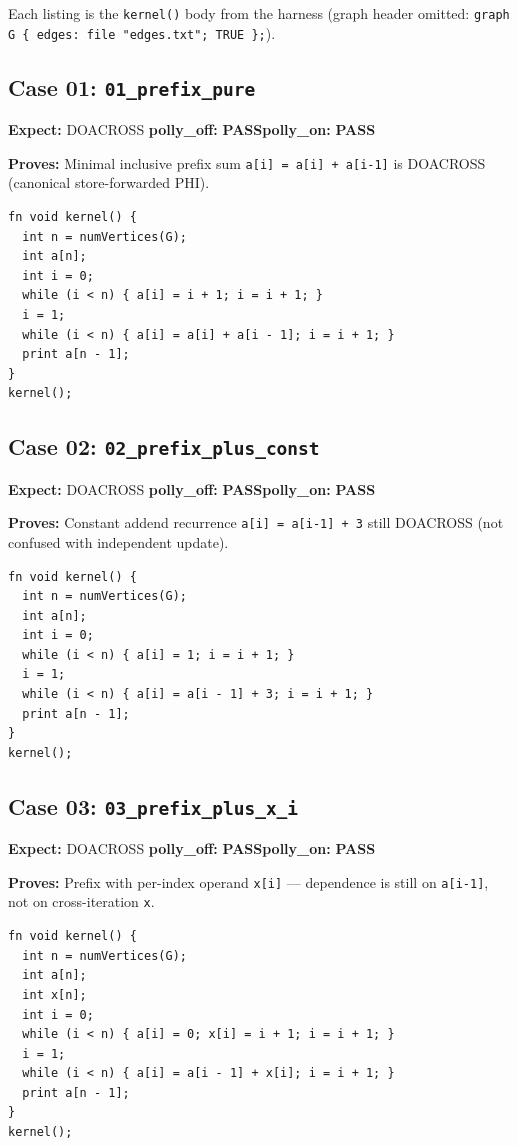 \documentclass[11pt,a4paper]{article}
\newcommand{\passmark}{\textcolor{pass}{\textbf{PASS}}}
\begin{document}
Each listing is the \texttt{kernel()} body from the harness (graph header omitted:
\texttt{graph G \{ edges: file "edges.txt"; TRUE \};}).

\subsection{Case 01: \texttt{01\_prefix\_pure}}
\textbf{Expect:} DOACROSS \quad \textbf{polly\_off:} \passmark \quad \textbf{polly\_on:} \passmark

\textbf{Proves:} Minimal inclusive prefix sum
\texttt{a[i] = a[i] + a[i-1]} is DOACROSS (canonical store-forwarded PHI).

\begin{lstlisting}
fn void kernel() {
  int n = numVertices(G);
  int a[n];
  int i = 0;
  while (i < n) { a[i] = i + 1; i = i + 1; }
  i = 1;
  while (i < n) { a[i] = a[i] + a[i - 1]; i = i + 1; }
  print a[n - 1];
}
kernel();
\end{lstlisting}

\subsection{Case 02: \texttt{02\_prefix\_plus\_const}}
\textbf{Expect:} DOACROSS \quad \textbf{polly\_off:} \passmark \quad \textbf{polly\_on:} \passmark

\textbf{Proves:} Constant addend recurrence \texttt{a[i] = a[i-1] + 3} still DOACROSS
(not confused with independent update).

\begin{lstlisting}
fn void kernel() {
  int n = numVertices(G);
  int a[n];
  int i = 0;
  while (i < n) { a[i] = 1; i = i + 1; }
  i = 1;
  while (i < n) { a[i] = a[i - 1] + 3; i = i + 1; }
  print a[n - 1];
}
kernel();
\end{lstlisting}

\subsection{Case 03: \texttt{03\_prefix\_plus\_x\_i}}
\textbf{Expect:} DOACROSS \quad \textbf{polly\_off:} \passmark \quad \textbf{polly\_on:} \passmark

\textbf{Proves:} Prefix with per-index operand \texttt{x[i]} --- dependence is still
on \texttt{a[i-1]}, not on cross-iteration \texttt{x}.

\begin{lstlisting}
fn void kernel() {
  int n = numVertices(G);
  int a[n];
  int x[n];
  int i = 0;
  while (i < n) { a[i] = 0; x[i] = i + 1; i = i + 1; }
  i = 1;
  while (i < n) { a[i] = a[i - 1] + x[i]; i = i + 1; }
  print a[n - 1];
}
kernel();
\end{lstlisting}
\end{document}
